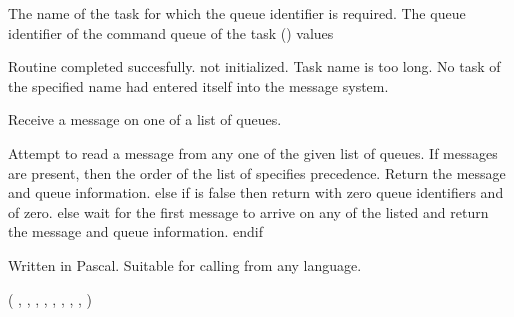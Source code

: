 \begin{appendix}
\begin{manroutinedescription}
\begin{manparametertable}
                          The name of the task for which the
                          queue identifier is required.
                          The queue identifier of the command queue
                          of the task
      ({\mantt{!}}) {}
      {} values
\end{manparametertable}
\begin{mantwocolumntable}
  Routine completed succesfully.
    {} not %
initialized.
  Task name is too long.
  No task of the specified %
name had
                              entered itself into the message
                              system.
\end{mantwocolumntable}
\end{manroutinedescription}
\begin{manroutinedescription}
      Receive a message on one of a list of queues.

      Attempt to read a message from any one of the given list of queues.
      If messages are present, then
         the order of the list of {} specifies
         precedence. Return the message and queue information.
      else if {} is false then
         return with zero queue identifiers
         and {} of zero.
      else
         wait for the first message to arrive on any of the listed {}
         and return the message and queue information.
      endif

     Written in Pascal. Suitable for calling from any language.

      {} {\mantt{=}} {} ( {}, {}, {},
            {}, {}, {}, {%
}, {},
            {} )


\end{manroutinedescription}
\end{appendix}
